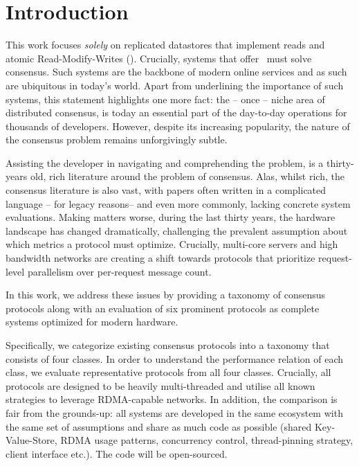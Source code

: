 \section{Introduction}
\label{sec:introduction}

This work focuses \emph{solely} on 
replicated datastores that implement reads and atomic Read-Modify-Writes (\RMW).
Crucially, systems that offer \RMWs~must solve consensus.
Such systems are the backbone of modern online services and as such are ubiquitous in today's world. Apart from underlining the importance of such systems, this statement  highlights one more fact: 
the -- once -- niche area of distributed consensus, is today an essential part of the day-to-day operations for thousands of developers.  However, despite its increasing popularity, the nature of the consensus problem remains unforgivingly subtle.

Assisting the developer in navigating and comprehending the problem, is a thirty-years old, rich literature around the problem of consensus. 
Alas, whilst rich, the consensus literature is also vast, with papers often written in a complicated language -- for legacy reasons-- and even more commonly, lacking concrete system evaluations.
Making matters worse, during the last thirty years, the hardware landscape has changed dramatically, challenging the prevalent assumption about which metrics a protocol must optimize. 
Crucially, multi-core servers and high bandwidth networks are creating a shift towards protocols that prioritize request-level parallelism over per-request message count.



\custvspace
In this work, we address these issues by providing a taxonomy of consensus protocols along with an evaluation of six prominent protocols as complete systems optimized for modern hardware.

Specifically, we categorize existing consensus protocols into a taxonomy that consists of four classes. %
In order to understand the performance relation of each class, we evaluate representative protocols from all four classes. %
Crucially, all protocols are %
designed to be  heavily multi-threaded and utilise all known strategies to leverage RDMA-capable networks.
In addition, the comparison is fair from the grounds-up: \ie all systems are developed in the same ecosystem with the same set of assumptions and share as much code as possible (\eg shared Key-Value-Store, RDMA usage patterns, concurrency control, thread-pinning strategy, client interface etc.). The code will be open-sourced.

